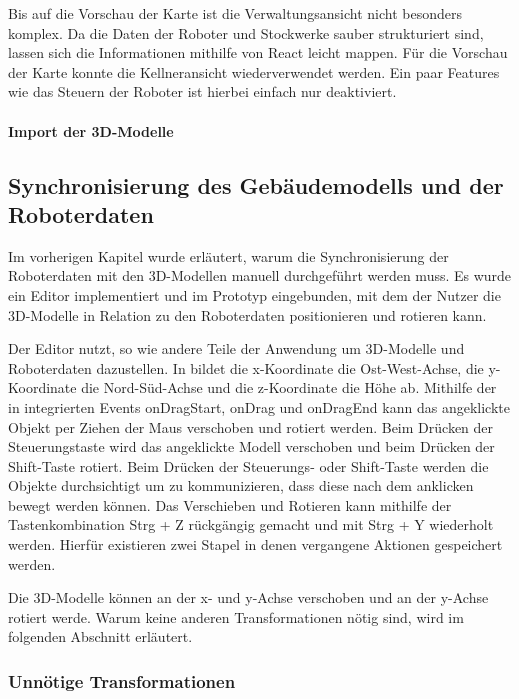 Bis auf die Vorschau der Karte ist die Verwaltungsansicht nicht besonders komplex. Da die Daten der Roboter und Stockwerke sauber strukturiert sind, lassen sich die Informationen mithilfe von React leicht mappen. Für die Vorschau der Karte konnte die Kellneransicht wiederverwendet werden. Ein paar Features wie das Steuern der Roboter ist hierbei einfach nur deaktiviert.

\paragraph{Import der 3D-Modelle}

\subsection{Synchronisierung des Gebäudemodells und der Roboterdaten}
Im vorherigen Kapitel wurde erläutert, warum die Synchronisierung der Roboterdaten mit den 3D-Modellen manuell durchgeführt werden muss. Es wurde ein Editor implementiert und im Prototyp eingebunden, mit dem der Nutzer die 3D-Modelle in Relation zu den Roboterdaten positionieren und rotieren kann.

Der Editor nutzt, so wie andere Teile der Anwendung \deckgl um 3D-Modelle und Roboterdaten dazustellen. In \deckgl bildet die x-Koordinate die Ost-West-Achse, die y-Koordinate die Nord-Süd-Achse und die z-Koordinate die Höhe ab. Mithilfe der in \deckgl integrierten Events onDragStart, onDrag und onDragEnd kann das angeklickte Objekt per Ziehen der Maus verschoben und rotiert werden. Beim Drücken der Steuerungstaste wird das angeklickte Modell verschoben und beim Drücken der Shift-Taste rotiert. Beim Drücken der Steuerungs- oder Shift-Taste werden die Objekte durchsichtigt um zu kommunizieren, dass diese nach dem anklicken bewegt werden können. Das Verschieben und Rotieren kann mithilfe der Tastenkombination Strg + Z rückgängig gemacht und mit Strg + Y wiederholt werden. Hierfür existieren zwei Stapel in denen vergangene Aktionen gespeichert werden.

Die 3D-Modelle können an der x- und y-Achse verschoben und an der y-Achse rotiert werde. Warum keine anderen Transformationen nötig sind, wird im folgenden Abschnitt erläutert.

\subsubsection{Unnötige Transformationen}


